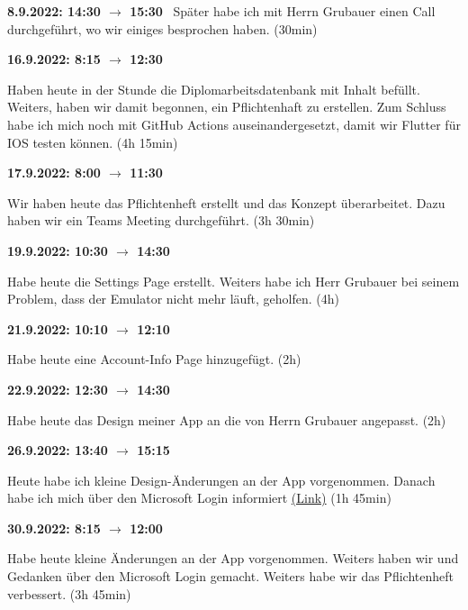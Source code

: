 \textbf{8.9.2022: 14:30 $\rightarrow$ 15:30} \
Später habe ich mit Herrn Grubauer einen Call durchgeführt, wo wir einiges besprochen haben. (30min)

\vspace{0.5cm}
\textbf{16.9.2022: 8:15 $\rightarrow$ 12:30} \

Haben heute in der Stunde die Diplomarbeitsdatenbank mit Inhalt befüllt. Weiters, haben wir damit begonnen, ein Pflichtenhaft zu erstellen. Zum Schluss habe ich mich noch mit GitHub Actions auseinandergesetzt, damit wir Flutter für IOS testen können. (4h 15min)

\vspace{0.5cm}

\textbf{17.9.2022: 8:00 $\rightarrow$ 11:30} \

Wir haben heute das Pflichtenheft erstellt und das Konzept überarbeitet. Dazu haben wir ein Teams Meeting durchgeführt. (3h 30min)

\vspace{0.5cm}

\textbf{19.9.2022: 10:30 $\rightarrow$ 14:30} \

Habe heute die Settings Page erstellt. Weiters habe ich Herr Grubauer bei seinem Problem, dass der Emulator nicht mehr läuft, geholfen. (4h)

\vspace{0.5cm}

\textbf{21.9.2022: 10:10 $\rightarrow$ 12:10} \

Habe heute eine Account-Info Page hinzugefügt. (2h)

\vspace{0.5cm}

\textbf{22.9.2022: 12:30 $\rightarrow$ 14:30} \

Habe heute das Design meiner App an die von Herrn Grubauer angepasst. (2h)

\vspace{0.5cm}

\textbf{26.9.2022: 13:40 $\rightarrow$ 15:15} \

Heute habe ich kleine Design-Änderungen an der App vorgenommen. Danach habe ich mich über den Microsoft Login informiert \href{https://ahmadelshafee28.medium.com/flutter-auth-using-firebase-oauth-and-azure-ad-a6f01b6d584}{(Link)} (1h 45min)

\vspace{0.5cm}

\textbf{30.9.2022: 8:15 $\rightarrow$ 12:00} \

Habe heute kleine Änderungen an der App vorgenommen. Weiters haben wir und Gedanken über den Microsoft Login gemacht. Weiters habe wir das Pflichtenheft verbessert. (3h 45min)

